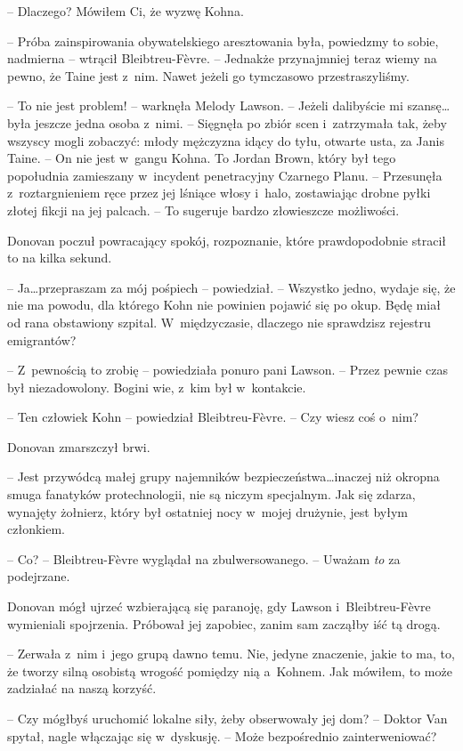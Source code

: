 \documentclass[oneside,polish,11pt,sfheadings]{mwbk}
\begin{document}
-- Dlaczego? Mówiłem Ci, że wyzwę Kohna.

-- Próba zainspirowania obywatelskiego aresztowania była, powiedzmy to
sobie, nadmierna -- wtrącił Bleibtreu-Fèvre. -- Jednakże przynajmniej teraz
wiemy na pewno, że Taine jest z~nim. Nawet jeżeli go tymczasowo
przestraszyliśmy.

-- To nie jest problem! -- warknęła Melody Lawson. -- Jeżeli dalibyście mi
szansę\ldots była jeszcze jedna osoba z~nimi. -- Sięgnęła po zbiór scen i~zatrzymała tak, żeby wszyscy mogli zobaczyć: młody mężczyzna idący do
tyłu, otwarte usta, za Janis Taine. -- On nie jest w~gangu Kohna. To
Jordan Brown, który był tego popołudnia zamieszany w~incydent
penetracyjny Czarnego Planu. -- Przesunęła z~roztargnieniem ręce przez
jej lśniące włosy i~halo, zostawiając drobne pyłki złotej fikcji na jej
palcach. -- To sugeruje bardzo złowieszcze możliwości.

Donovan poczuł powracający spokój, rozpoznanie, które prawdopodobnie
stracił to na kilka sekund.

-- Ja\ldots przepraszam za mój pośpiech -- powiedział. -- Wszystko jedno,
wydaje się, że nie ma powodu, dla którego Kohn nie powinien pojawić się
po okup. Będę miał od rana obstawiony szpital. W~międzyczasie, dlaczego
nie sprawdzisz rejestru emigrantów?

-- Z~pewnością to zrobię -- powiedziała ponuro pani Lawson. -- Przez pewnie
czas był niezadowolony. Bogini wie, z~kim był w~kontakcie.

-- Ten człowiek Kohn -- powiedział Bleibtreu-Fèvre. -- Czy wiesz coś o~nim?

Donovan zmarszczył brwi. 

-- Jest przywódcą małej grupy najemników
bezpieczeństwa\ldots inaczej niż okropna smuga fanatyków protechnologii,
nie są niczym specjalnym. Jak się zdarza, wynajęty żołnierz, który był
ostatniej nocy w~mojej drużynie, jest byłym członkiem.

-- Co? -- Bleibtreu-Fèvre wyglądał na zbulwersowanego. -- Uważam \emph{to}
za podejrzane.

Donovan mógł ujrzeć wzbierającą się paranoję, gdy Lawson i~Bleibtreu-Fèvre wymieniali spojrzenia. Próbował jej zapobiec, zanim sam
zacząłby iść tą drogą.

-- Zerwała z~nim i~jego grupą dawno temu. Nie, jedyne znaczenie, jakie to
ma, to, że tworzy silną osobistą wrogość pomiędzy nią a~Kohnem. Jak
mówiłem, to może zadziałać na naszą korzyść.

-- Czy mógłbyś uruchomić lokalne siły, żeby obserwowały jej dom? -- Doktor
Van spytał, nagle włączając się w~dyskusję. -- Może bezpośrednio
zainterweniować?
\end{document}
